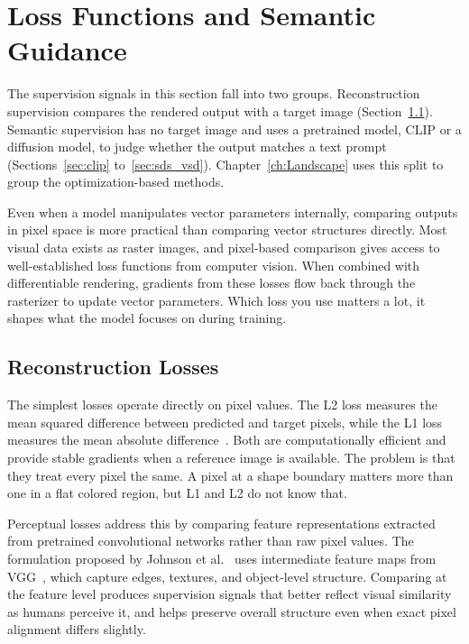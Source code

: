 \section{Loss Functions and Semantic Guidance}

The supervision signals in this section fall into two groups. 
Reconstruction supervision compares the rendered output with a 
target image (Section~\ref{sec:recon_losses}). Semantic supervision 
has no target image and uses a pretrained model, CLIP or a diffusion 
model, to judge whether the output matches a text prompt 
(Sections~\ref{sec:clip} to~\ref{sec:sds_vsd}). 
Chapter~\ref{ch:Landscape} uses this split to group the 
optimization-based methods.

Even when a model manipulates vector parameters internally, 
comparing outputs in pixel space is more practical than 
comparing vector structures directly. Most visual data exists 
as raster images, and pixel-based comparison gives access to 
well-established loss functions from computer vision. When 
combined with differentiable rendering, gradients from these 
losses flow back through the rasterizer to update vector 
parameters. Which loss you use matters a lot, it shapes 
what the model focuses on during training.

\subsection{Reconstruction Losses}
\label{sec:recon_losses}

The simplest losses operate directly on pixel values. The L2 
loss measures the mean squared difference between predicted 
and target pixels, while the L1 loss measures the mean 
absolute difference~\cite{goodfellow2016deep}. Both are 
computationally efficient and provide stable gradients when 
a reference image is available. The problem is that they treat 
every pixel the same. A pixel at a shape boundary matters more
than one in a flat colored region, but L1 and L2 do not know that.

Perceptual losses address this by comparing feature 
representations extracted from pretrained convolutional 
networks rather than raw pixel values. The formulation 
proposed by Johnson et al.~\cite{johnsonPerceptualLossesRealTime2016} 
uses intermediate feature maps from VGG~\cite{simonyan2015very}, 
which capture edges, textures, and object-level structure. 
Comparing at the feature level produces supervision signals 
that better reflect visual similarity as humans perceive it, 
and helps preserve overall structure even when exact pixel 
alignment differs slightly.

